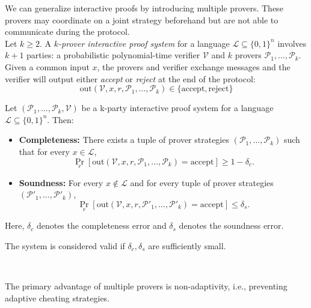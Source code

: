 We can generalize interactive proofs by introducing multiple provers. These provers may coordinate on a joint strategy beforehand but are not able to communicate during the protocol. \\

\noindent Let $k \ge 2$. A \emph{$k$-prover interactive proof system} for a language $\mathcal{L} \subseteq \{0,1\}^n$ involves $k+1$ parties: a probabilistic polynomial-time verifier $\mathcal{V}$ and $k$ provers $\mathcal{P}_1, \dots, \mathcal{P}_k$.  Given a common input $x$, the provers and verifier exchange messages and the verifier will output either \emph{accept} or \emph{reject} at the end of the protocol: \\

$$\text{out}(\mathcal{V}, x, r, \mathcal{P}_1, \dots, \mathcal{P}_k) \in \{\text{accept},\text{reject}\}$$

\myspace

\begin{definition} Let $(\mathcal{P}_1, \dots, \mathcal{P}_k, \mathcal{V})$ be a k-party interactive proof system for a language $\mathcal{L} \subseteq \{0,1\}^n$. Then:

\begin{itemize}
    \item \textbf{Completeness:} There exists a tuple of prover strategies $(\mathcal{P}_1, \dots, \mathcal{P}_k)$ such that for every $x \in \mathcal{L}$,
    \[
    \Pr_r[\text{out}(\mathcal{V}, x, r, \mathcal{P}_1, \dots, \mathcal{P}_k) = \text{accept}] \ge 1 - \delta_c.
    \]
    
    \item \textbf{Soundness:} For every $x \notin \mathcal{L}$ and for every tuple of prover strategies $(\mathcal{P}'_1, \dots, \mathcal{P}'_k)$,
    \[
    \Pr_r[\text{out}(\mathcal{V}, x, r, \mathcal{P}'_1, \dots, \mathcal{P}'_k) = \text{accept}] \le \delta_s.
    \]
\end{itemize}

Here, $\delta_c$ denotes the completeness error and  $\delta_s$ denotes the soundness error.  
\end{definition}

\begin{remark}
The system is considered valid if $\delta_c, \delta_s$ are sufficiently small.
\end{remark} \\

\begin{remark}
The primary advantage of multiple provers is non-adaptivity, i.e., preventing adaptive cheating strategies.
\end{remark}

